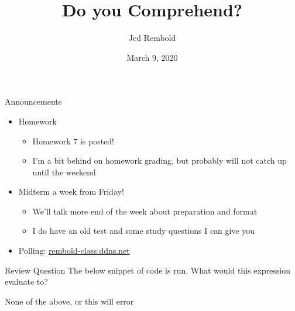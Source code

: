 \documentclass[pdf, aspectratio=169, 12pt]{beamer}
\title{Do you Comprehend?}
\author{Jed Rembold}
\date{March 9, 2020}
\begin{document}
\begin{frame}{Announcements}
	\begin{itemize}
		\item Homework
			\begin{itemize}
				\item Homework 7 is posted!
				\item I'm a bit behind on homework grading, but probably will not catch up until the weekend
			\end{itemize}
		\item Midterm a week from Friday!
			\begin{itemize}
				\item We'll talk more end of the week about preparation and format
				\item I do have an old test and some study questions I can give you
			\end{itemize}
			
		\item Polling: \url{rembold-class.ddns.net}
	\end{itemize}
\end{frame}

\begin{frame}[fragile]{Review Question}
		The below snippet of code is run. What would this expression evaluate to?
		\begin{center}
		\end{center}
		\begin{poll}
			\item \pyi{['One']}
			\item {}
			\item {}
			\item None of the above, or this will error
		\end{poll}
\end{frame}

\end{document}
